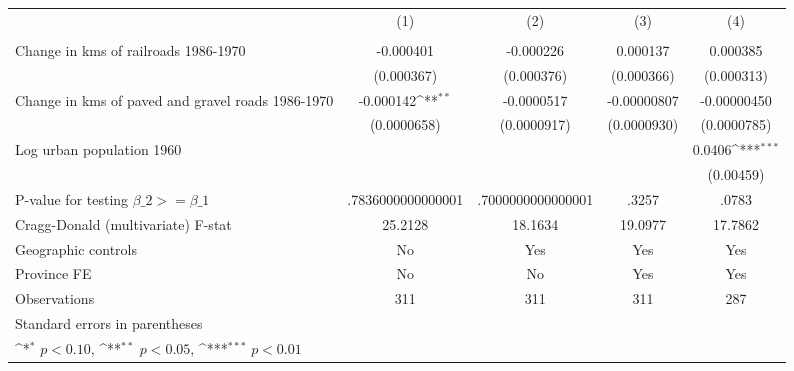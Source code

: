 {
\def\sym#1{\ifmmode^{#1}\else\(^{#1}\)\fi}
\begin{tabular}{l*{4}{c}}
\hline\hline
                &\multicolumn{1}{c}{(1)}&\multicolumn{1}{c}{(2)}&\multicolumn{1}{c}{(3)}&\multicolumn{1}{c}{(4)}\\
                &\multicolumn{1}{c}{}&\multicolumn{1}{c}{}&\multicolumn{1}{c}{}&\multicolumn{1}{c}{}\\
\hline
Change in kms of railroads 1986-1970&-0.000401         &-0.000226         & 0.000137         & 0.000385         \\
                &(0.000367)         &(0.000376)         &(0.000366)         &(0.000313)         \\
[1em]
Change in kms of paved and gravel roads 1986-1970&-0.000142\sym{**} &-0.0000517         &-0.00000807         &-0.00000450         \\
                &(0.0000658)         &(0.0000917)         &(0.0000930)         &(0.0000785)         \\
[1em]
Log urban population 1960&                  &                  &                  &   0.0406\sym{***}\\
                &                  &                  &                  &(0.00459)         \\
\hline
P-value for testing $\beta\_{2} >= \beta\_{1}$&.7836000000000001         &.7000000000000001         &    .3257         &    .0783         \\
Cragg-Donald (multivariate) F-stat&  25.2128         &  18.1634         &  19.0977         &  17.7862         \\
Geographic controls&       No         &      Yes         &      Yes         &      Yes         \\
Province FE     &       No         &       No         &      Yes         &      Yes         \\
Observations    &      311         &      311         &      311         &      287         \\
\hline\hline
\multicolumn{5}{l}{\footnotesize Standard errors in parentheses}\\
\multicolumn{5}{l}{\footnotesize \sym{*} \(p<0.10\), \sym{**} \(p<0.05\), \sym{***} \(p<0.01\)}\\
\end{tabular}
}
